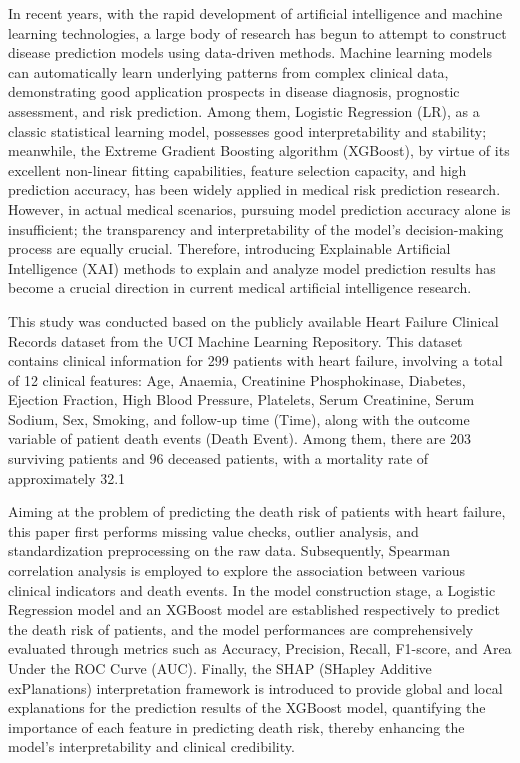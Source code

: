 \documentclass[11pt,a4paper]{article}
\begin{document}
In recent years, with the rapid development of artificial intelligence and machine learning technologies, a large body of research has begun to attempt to construct disease prediction models using data-driven methods. Machine learning models can automatically learn underlying patterns from complex clinical data, demonstrating good application prospects in disease diagnosis, prognostic assessment, and risk prediction. Among them, Logistic Regression (LR), as a classic statistical learning model, possesses good interpretability and stability; meanwhile, the Extreme Gradient Boosting algorithm (XGBoost), by virtue of its excellent non-linear fitting capabilities, feature selection capacity, and high prediction accuracy, has been widely applied in medical risk prediction research. However, in actual medical scenarios, pursuing model prediction accuracy alone is insufficient; the transparency and interpretability of the model's decision-making process are equally crucial. Therefore, introducing Explainable Artificial Intelligence (XAI) methods to explain and analyze model prediction results has become a crucial direction in current medical artificial intelligence research.

This study was conducted based on the publicly available Heart Failure Clinical Records dataset from the UCI Machine Learning Repository. This dataset contains clinical information for 299 patients with heart failure, involving a total of 12 clinical features: Age, Anaemia, Creatinine Phosphokinase, Diabetes, Ejection Fraction, High Blood Pressure, Platelets, Serum Creatinine, Serum Sodium, Sex, Smoking, and follow-up time (Time), along with the outcome variable of patient death events (Death Event). Among them, there are 203 surviving patients and 96 deceased patients, with a mortality rate of approximately 32.1%

Aiming at the problem of predicting the death risk of patients with heart failure, this paper first performs missing value checks, outlier analysis, and standardization preprocessing on the raw data. Subsequently, Spearman correlation analysis is employed to explore the association between various clinical indicators and death events. In the model construction stage, a Logistic Regression model and an XGBoost model are established respectively to predict the death risk of patients, and the model performances are comprehensively evaluated through metrics such as Accuracy, Precision, Recall, F1-score, and Area Under the ROC Curve (AUC). Finally, the SHAP (SHapley Additive exPlanations) interpretation framework is introduced to provide global and local explanations for the prediction results of the XGBoost model, quantifying the importance of each feature in predicting death risk, thereby enhancing the model's interpretability and clinical credibility.
\end{document}
